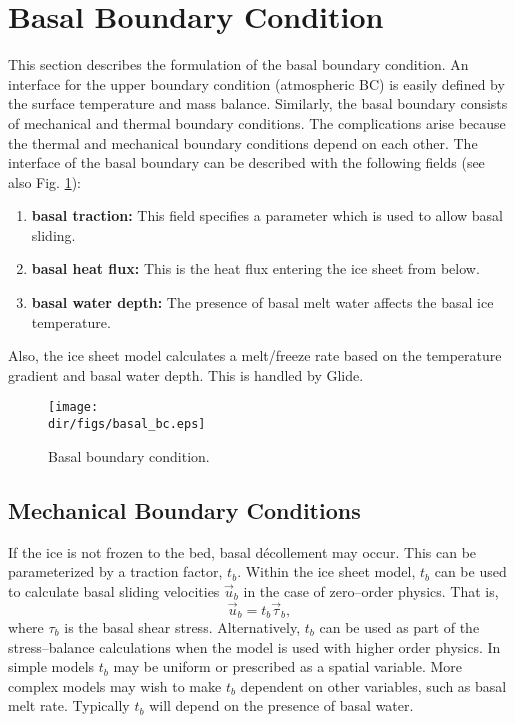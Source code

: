 \section{Basal Boundary Condition}
This section describes the formulation of the basal boundary condition.
An interface for the upper boundary condition (atmospheric BC) is easily defined by the surface temperature and mass balance. Similarly, the basal boundary consists of mechanical and thermal boundary conditions. The complications arise because the thermal and mechanical boundary conditions depend on each other. The interface of the basal boundary can be described with the following fields (see also Fig. \ref{num.fig.basal_bc}):
\begin{enumerate}
\item \textbf{basal traction:} This field specifies a parameter which is used to allow basal sliding.
\item \textbf{basal heat flux:} This is the heat flux entering the ice sheet from below.
\item \textbf{basal water depth:} The presence of basal melt water affects the basal ice temperature.
\end{enumerate}
Also, the ice sheet model calculates a melt/freeze rate based on the temperature gradient and basal water depth. This is handled by Glide.

\begin{figure}[htbp]
  \centering
  \texttt{[image: \\dir/figs/basal\_bc.eps]}
  \caption{Basal boundary condition.}
  \label{num.fig.basal_bc}
\end{figure}

\subsection{Mechanical Boundary Conditions}
If the ice is not frozen to the bed, basal d\'{e}collement may occur. This can be parameterized by a traction factor, $t_b$. 
Within the ice sheet model, $t_b$ can be used to calculate basal sliding velocities $\vec{u}_b$ in the case of zero--order physics. That is,
\begin{equation}
  \vec{u}_b=t_b\vec{\tau}_b,
\end{equation}
where $\tau_b$ is the basal shear stress. Alternatively, $t_b$ can be used as part of the stress--balance calculations when the model is used with higher order physics. In simple models $t_b$ may be uniform or prescribed as a spatial variable. More complex models may wish to make $t_b$ dependent on other variables, such as basal melt rate. Typically $t_b$ will depend on the presence of basal water.

